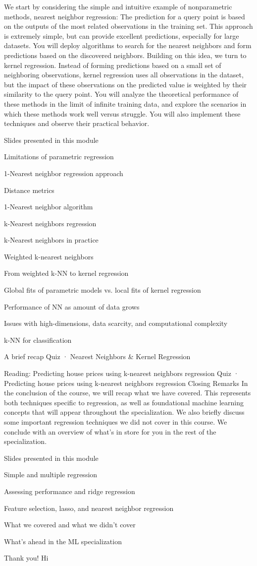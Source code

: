 We start by considering the simple and intuitive example of nonparametric methods, nearest neighbor regression: The prediction for a query point is based on the outputs of the most related observations in the training set. This approach is extremely simple, but can provide excellent predictions, especially for large datasets. You will deploy algorithms to search for the nearest neighbors and form predictions based on the discovered neighbors. Building on this idea, we turn to kernel regression. Instead of forming predictions based on a small set of neighboring observations, kernel regression uses all observations in the dataset, but the impact of these observations on the predicted value is weighted by their similarity to the query point. You will analyze the theoretical performance of these methods in the limit of infinite training data, and explore the scenarios in which these methods work well versus struggle. You will also implement these techniques and observe their practical behavior.

\item Slides presented in this module
\item Limitations of parametric regression
\item 1-Nearest neighbor regression approach
\item Distance metrics
\item 1-Nearest neighbor algorithm
\item k-Nearest neighbors regression
\item k-Nearest neighbors in practice
\item Weighted k-nearest neighbors
\item From weighted k-NN to kernel regression
\item Global fits of parametric models vs. local fits of kernel regression
\item Performance of NN as amount of data grows
\item Issues with high-dimensions, data scarcity, and computational complexity
\item k-NN for classification
\item A brief recap
Quiz · Nearest Neighbors & Kernel Regression
\item Reading: Predicting house prices using k-nearest neighbors regression
Quiz · Predicting house prices using k-nearest neighbors regression
Closing Remarks
In the conclusion of the course, we will recap what we have covered. This represents both techniques specific to regression, as well as foundational machine learning concepts that will appear throughout the specialization. We also briefly discuss some important regression techniques we did not cover in this course.
We conclude with an overview of what's in store for you in the rest of the specialization.

\item Slides presented in this module
\item Simple and multiple regression
\item Assessing performance and ridge regression
\item Feature selection, lasso, and nearest neighbor regression
\item What we covered and what we didn't cover
\item What's ahead in the ML specialization
\item Thank you!
Hi

